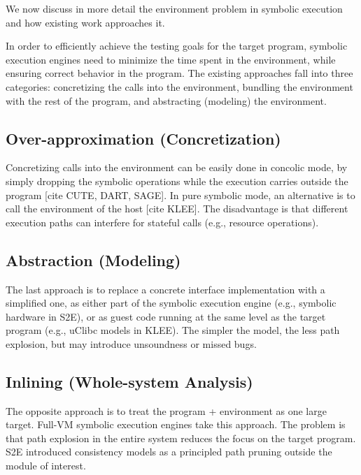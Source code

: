 We now discuss in more detail the environment problem in symbolic execution and how existing work approaches it.

In order to efficiently achieve the testing goals for the target program, symbolic execution engines need to minimize the time spent in the environment, while ensuring correct behavior in the program.
%
The existing approaches fall into three categories: concretizing the calls into the environment, bundling the environment with the rest of the program, and abstracting (modeling) the environment.

\subsection{Over-approximation (Concretization)}

Concretizing calls into the environment can be easily done in concolic mode, by simply dropping the symbolic operations while the execution carries outside the program [cite CUTE, DART, SAGE].  In pure symbolic mode, an alternative is to call the environment of the host [cite KLEE].  The disadvantage is that different execution paths can interfere for stateful calls (e.g., resource operations).

\subsection{Abstraction (Modeling)}

The last approach is to replace a concrete interface implementation with a simplified one, as either part of the symbolic execution engine (e.g., symbolic hardware in S2E), or as guest code running at the same level as the target program (e.g., uClibc models in KLEE).  The simpler the model, the less path explosion, but may introduce unsoundness or missed bugs.

\subsection{Inlining (Whole-system Analysis)}

The opposite approach is to treat the program + environment as one large target.  Full-VM symbolic execution engines take this approach.  The problem is that path explosion in the entire system reduces the focus on the target program.  S2E introduced consistency models as a principled path pruning outside the module of interest.


